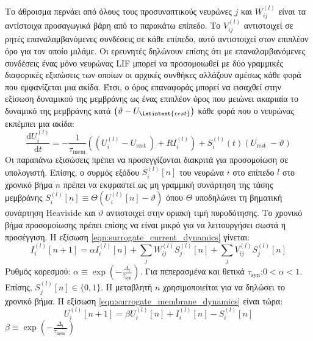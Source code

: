 \documentclass[12pt]{report}
\begin{document}
Tο άθροισμα περνάει από όλους τους προσυναπτικούς νευρώνες $j$ και $W_{i j}^{(l)}$ είναι τα αντίστοιχα προσαγωγικά βάρη από το παρακάτω επίπεδο. Το $V_{i j}^{(l)}$ αντιστοιχεί σε ρητές επαναλαμβανόμενες συνδέσεις σε κάθε επίπεδο, αυτό αντιστοιχεί στον επιπλέον όρο για τον οποίο μιλάμε. Οι ερευνητές δηλώνουν επίσης ότι με επαναλαμβανόμενες συνδέσεις ένας μόνο νευρώνας \textlatin{LIF} μπορεί να προσομοιωθεί με δύο γραμμικές διαφορικές εξισώσεις των οποίων οι αρχικές συνθήκες αλλάζουν αμέσως κάθε φορά που εμφανίζεται μια ακίδα. Έτσι, ο όρος επαναφοράς μπορεί να εισαχθεί στην εξίσωση δυναμικού της μεμβράνης ως ένας επιπλέον όρος που μειώνει ακαριαία το δυναμικό της μεμβράνης κατά $\left(\vartheta-U_{\latintext {rest }}\right)$ κάθε φορά που ο νευρώνας εκπέμπει μια ακίδα:
\begin{equation}
\label{eqn:surrogate_membrane_dynamics}
\frac{\mathrm{d} U_{i}^{(l)}}{\mathrm{d} t}=-\frac{1}{\tau_{\mathrm{mem}}}\left(\left(U_{i}^{(l)}-U_{\text {rest }}\right)+R I_{i}^{(l)}\right)+S_{i}^{(l)}(t)\left(U_{\text {rest }}-\vartheta\right)
\end{equation}
Οι παραπάνω εξισώσεις πρέπει να προσεγγίζονται διακριτά για προσομοίωση σε υπολογιστή. Επίσης, ο συρμός εξόδου $S_{i}^{(l)}[n]$ του νευρώνα $i$ στο επίπεδο $l$ στο χρονικό βήμα $n$ πρέπει να εκφραστεί ως μη γραμμική συνάρτηση της τάσης μεμβράνης $S_{i}^{(l)}[n] \equiv \Theta\left(U_{i}^{(l)}[n]-\vartheta\right)$ όπου $\Theta$ υποδηλώνει τη βηματική συνάρτηση \textlatin{Heaviside} και $\vartheta$ αντιστοιχεί στην οριακή τιμή πυροδότησης. Το χρονικό βήμα προσομοίωσης πρέπει επίσης να είναι μικρό για να λειτουργήσει σωστά η προσέγγιση. Η εξίσωση \ref{eqn:surrogate_current_dynamics} γίνεται:
\begin{equation}
I_{i}^{(l)}[n+1]=\alpha I_{i}^{(l)}[n]+\sum_{j} W_{i j}^{(l)} S_{j}^{(l)}[n]+\sum_{j} V_{i j}^{(l)} S_{j}^{(l)}[n]
\end{equation}
Ρυθμός κορεσμού: $\alpha \equiv \exp \left(-\frac{\Delta_{t}}{\tau_{\mathrm{syn}}}\right) .$  Για πεπερασμένα και θετικά $\tau_{\mathrm{syn}}$:$0<\alpha<1$. Επίσης, $S_{j}^{(l)}[n] \in\{0,1\} .$ Η μεταβλητή $n$ χρησιμοποιείται για να δηλώσει το χρονικό βήμα. Η εξίσωση \ref{eqn:surrogate_membrane_dynamics} είναι τώρα:
\begin{equation}
U_{i}^{(l)}[n+1]=\beta U_{i}^{(l)}[n]+I_{i}^{(l)}[n]-S_{i}^{(l)}[n]
\end{equation}
$\beta \equiv \exp \left(-\frac{\Delta_{t}}{\tau_{\text {mem }}}\right)$
\end{document}
